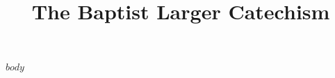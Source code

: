 \documentclass[12pt,article]{article}
\begin{document}
\title{The Baptist Larger Catechism}
\maketitle
\tableofcontents
\newpage

$body$
\end{document}
